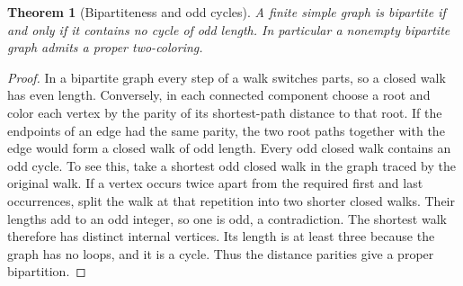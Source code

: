 \documentclass[11pt,oneside,openany]{book}
\theoremstyle{plain}
\newtheorem{theorem}{Theorem}[chapter]
\theoremstyle{definition}
\theoremstyle{remark}
\begin{document}
\begin{theorem}[Bipartiteness and odd cycles]\label{p204:W58}
A finite simple graph is bipartite if and only if it contains no
cycle of odd length. In particular a nonempty bipartite graph admits
a proper two-coloring.
\end{theorem}
\begin{proof}
In a bipartite graph every step of a walk switches parts, so a closed
walk has even length. Conversely, in each connected component choose
a root and color each vertex by the parity of its shortest-path
distance to that root. If the endpoints of an edge had the same
parity, the two root paths together with the edge would form a
closed walk of odd length. Every odd closed walk contains an odd
cycle. To see this, take a shortest odd closed walk in the graph
traced by the original walk. If a vertex occurs twice apart from
the required first and last occurrences, split the walk at that
repetition into two shorter closed walks. Their lengths add to an
odd integer, so one is odd, a contradiction. The shortest walk
therefore has distinct internal vertices. Its length is at least
three because the graph has no loops, and it is a cycle.
Thus the distance parities give a proper bipartition.
\end{proof}
\end{document}

